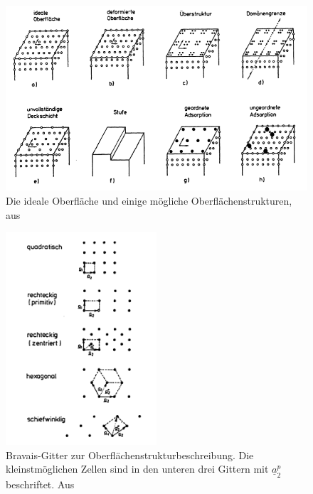 \begin{figure}
    \includegraphics[width=1.0\textwidth]{pics/oberflaechenstruktur}
    \caption{Die ideale Oberfläche und einige mögliche Oberflächenstrukturen, 
aus \cite{henzler1991oberflachenphysik} }
    \label{fig:oberflaeche}
\end{figure} 
\begin{figure}
    \includegraphics[width=0.5\textwidth]{pics/Bravais}
    \caption{Bravais-Gitter zur Oberflächenstrukturbeschreibung. Die kleinstmöglichen
Zellen sind in den unteren drei Gittern mit $\underline{a}_2^p$ beschriftet. 
Aus \cite{henzler1991oberflachenphysik} }
    \label{fig:Bravais}
\end{figure} 


